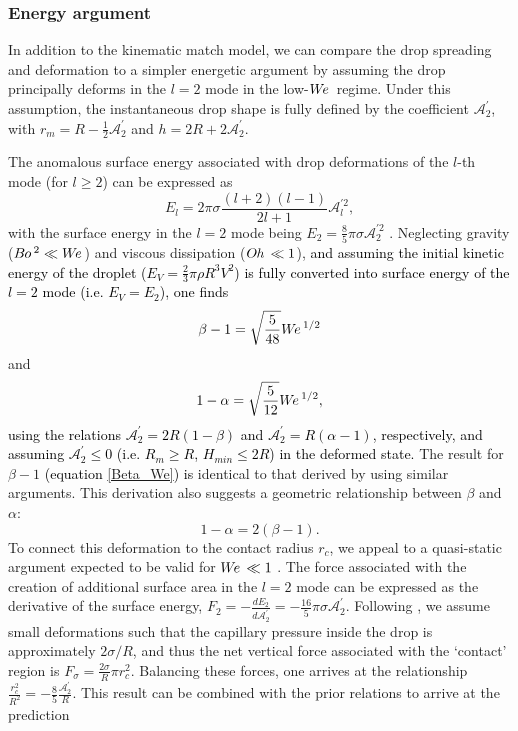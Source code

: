 \documentclass{jfm}
\newcommand{\edit}[1]{\textcolor{black}{#1}}
\newcommand{\We}{W\kern-0.15em e\,}
\newcommand{\Bo}{B\kern-0.05em o\,}
\newcommand{\Oh}{O\kern-0.05em h\,}
\begin{document}
\subsubsection{Energy argument} \label{subsubsec:energyarguments}
In addition to the kinematic match model, we can compare the drop spreading and deformation to a simpler energetic argument by assuming the drop principally deforms in the $l=2$ mode in the low-$\We$ regime.  Under this assumption, the instantaneous drop shape is fully defined by the coefficient $\mathscr{A}_2^{\prime}$, with $r_{m}=R-\frac{1}{2}\mathscr{A}_2^{\prime}$ and $h=2R+2\mathscr{A}_2^{\prime}$. 

The anomalous surface energy associated with drop deformations of the $l$-th mode (for $l\geq2$) can be expressed as
\begin{equation}
E_l=2 \pi \sigma \frac{(l+2)(l-1)}{2 l+1} \mathscr{A}_l^{\prime 2},
\end{equation}
with the surface energy in the $l=2$ mode being $E_2=\frac{8}{5} \pi \sigma \mathscr{A}_{2}^{\prime 2}$ \citep{molavcek2012quasi}. Neglecting gravity ($\Bo^{2} \ll \We$) and viscous dissipation ($\Oh\ll1$), \edit{and assuming the initial kinetic energy of the droplet ($E_V=\frac{2}{3}\pi\rho R^3 V^2$) is fully converted into surface energy of the $l=2$ mode (i.e. $E_V=E_2$), one finds}
\begin{equation}
\beta-1=\sqrt{\frac{5}{48}} \We^{1 / 2}  \label{Beta_We}
\end{equation}
 and 
 \begin{equation}
1-\alpha=\sqrt{\frac{5}{12}} \We^{1 / 2}, \label{Alpha_We}
 \end{equation}
\edit{using the relations $\mathscr{A}_{2}^{\prime}=2R\left(1-\beta\right)$ and $\mathscr{A}_{2}^{\prime}=R\left(\alpha-1\right)$, respectively, and assuming $\mathscr{A}_{2}^{\prime}\leq0$ (i.e. $R_m\geq R$, $H_{min}\leq 2R$) in the deformed state.} The result for $\beta - 1$ \edit{(equation \ref{Beta_We}) is} identical to that derived by \citet{richard2000bouncing} using similar arguments.   This derivation also suggests a geometric relationship between $\beta$ and $\alpha$: 
 \begin{equation}
1-\alpha=2(\beta-1). \label{Alpha_Beta}
 \end{equation}
 To connect this deformation to the contact radius $r_c$, we appeal to a quasi-static argument expected to be valid for $\We\ll 1$ \citep{chevy2012liquid,molavcek2012quasi}.  The force associated with the creation of additional surface area in the $l=2$ mode can be expressed as the derivative of the surface energy, $F_2=-\frac{dE_2}{d\mathscr{A}_2^{\prime}}=-\frac{16}{5}\pi\sigma\mathscr{A}_2^{\prime}$.  Following \citet{chevy2012liquid}, we assume small deformations such that the capillary pressure inside the drop is approximately $2\sigma/R$, and thus the net vertical force associated with the `contact' region is $F_{\sigma}=\frac{2\sigma}{R}\pi r_c^2$.  Balancing these forces, one arrives at the relationship $\frac{r_c^2}{R^2}=-\frac{8}{5} \frac{\mathscr{A}_2^{\prime}}{R}$.  This result can be combined with the prior relations to arrive at the prediction
\end{document}
